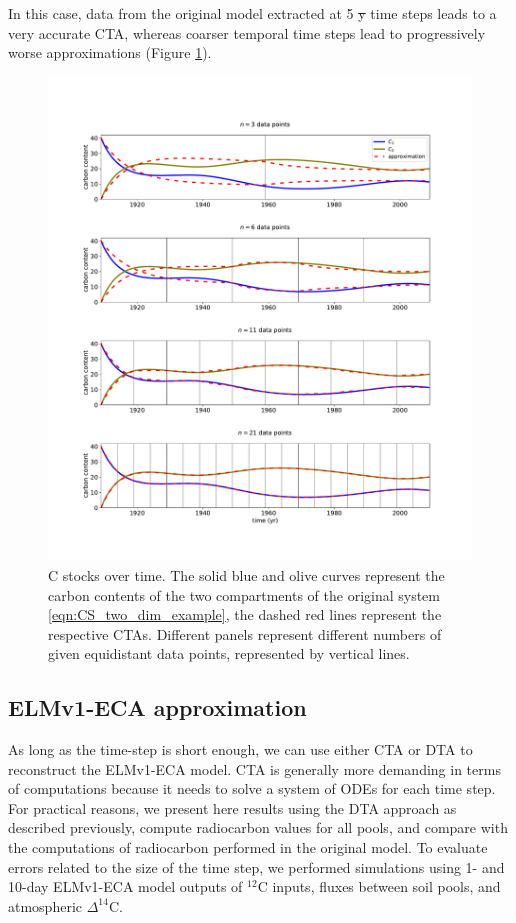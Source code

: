 \documentclass[draft]{agujournal2019}
\providecommand{\DIFadd}[1]{{\protect\color{blue}\uwave{#1}}} %
\providecommand{\DIFdel}[1]{{\protect\color{red}\sout{#1}}}                      %
\providecommand{\DIFaddbegin}{} %
\providecommand{\DIFaddend}{} %
\providecommand{\DIFdelbegin}{} %
\providecommand{\DIFdelend}{} %
\begin{document}
     In this case, data from the original model extracted at 5 \DIFdelbegin \DIFdel{y }\DIFdelend \DIFaddbegin \DIFadd{yr }\DIFaddend time steps leads to a very accurate CTA, whereas coarser temporal time steps lead to progressively worse approximations (Figure \ref{fig:CS_two_dim_example}).
    \begin{figure}[htbp]
        \centering 
        \includegraphics[width=1.0\linewidth]{figs/interpol_pwc_2.pdf}
        \caption{C stocks over time.
            The solid blue and olive curves represent the carbon contents of the two compartments of the original system \eqref{eqn:CS_two_dim_example}, the dashed red lines represent the respective CTAs. Different panels represent different numbers of given equidistant data points, represented by vertical lines.
            }
        \label{fig:CS_two_dim_example}
    \end{figure}        

\subsection{ELMv1-ECA approximation}
As long as the time-step is short enough, we can use either CTA or DTA to reconstruct the ELMv1-ECA model. CTA is generally more demanding in terms of computations because it needs to solve a system of ODEs for each time step. For practical reasons, we present here results using the DTA approach as described previously, compute radiocarbon values for all pools, and compare with the computations of radiocarbon performed in the original model. To evaluate errors related to the size of the time step, we performed simulations using 1- and 10-day ELMv1-ECA model outputs of $^{12}$C inputs, fluxes between soil pools, and atmospheric $\Delta^{14}$C. 
\end{document}
